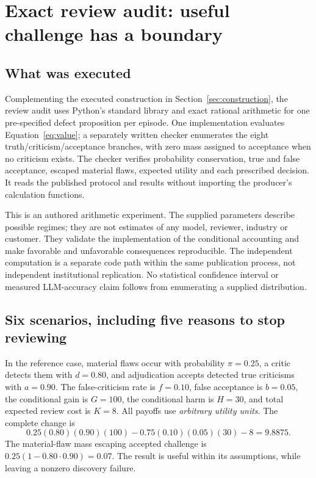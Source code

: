 \section{Exact review audit: useful challenge has a boundary}
\label{sec:study}
\subsection{What was executed}
Complementing the executed construction in Section~\ref{sec:construction}, the review audit uses Python's standard library and exact rational arithmetic for one pre-specified defect proposition per episode. One implementation evaluates Equation~\eqref{eq:value}; a separately written checker enumerates the eight truth/criticism/acceptance branches, with zero mass assigned to acceptance when no criticism exists. The checker verifies probability conservation, true and false acceptance, escaped material flaws, expected utility and each prescribed decision. It reads the published protocol and results without importing the producer's calculation functions.

This is an authored arithmetic experiment. The supplied parameters describe possible regimes; they are not estimates of any model, reviewer, industry or customer. They validate the implementation of the conditional accounting and make favorable and unfavorable consequences reproducible. The independent computation is a separate code path within the same publication process, not independent institutional replication. No statistical confidence interval or measured LLM-accuracy claim follows from enumerating a supplied distribution.

\subsection{Six scenarios, including five reasons to stop reviewing}
In the reference case, material flaws occur with probability $\pi=0.25$, a critic detects them with $d=0.80$, and adjudication accepts detected true criticisms with $a=0.90$. The false-criticism rate is $f=0.10$, false acceptance is $b=0.05$, the conditional gain is $G=100$, the conditional harm is $H=30$, and total expected review cost is $K=8$. All payoffs use \emph{arbitrary utility units}. The complete change is
\begin{equation}
0.25(0.80)(0.90)(100)-0.75(0.10)(0.05)(30)-8=9.8875.
\end{equation}
The material-flaw mass escaping accepted challenge is $0.25(1-0.80\cdot0.90)=0.07$. The result is useful within its assumptions, while leaving a nonzero discovery failure.

